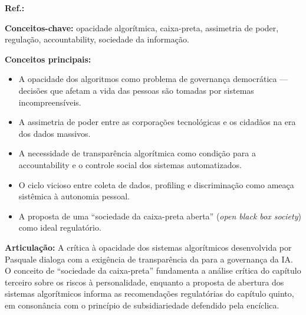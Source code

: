 \begin{fichamento}
    \textbf{Ref.:} \cite{Pasquale2015BM}
    
    \textbf{Conceitos-chave:} opacidade algorítmica, caixa-preta, assimetria de poder, regulação, accountability, sociedade da informação.
    
    \textbf{Conceitos principais:}
    \begin{itemize}
        \item A opacidade dos algoritmos como problema de governança democrática — decisões que afetam a vida das pessoas são tomadas por sistemas incompreensíveis.
        \item A assimetria de poder entre as corporações tecnológicas e os cidadãos na era dos dados massivos.
        \item A necessidade de transparência algorítmica como condição para a accountability e o controle social dos sistemas automatizados.
        \item O ciclo vicioso entre coleta de dados, profiling e discriminação como ameaça sistêmica à autonomia pessoal.
        \item A proposta de uma ``sociedade da caixa-preta aberta'' (\textit{open black box society}) como ideal regulatório.
    \end{itemize}
    
    \textbf{Articulação:} A crítica à opacidade dos sistemas algorítmicos desenvolvida por Pasquale dialoga com a exigência de transparência da \MH{} para a governança da IA. O conceito de ``sociedade da caixa-preta'' fundamenta a análise crítica do capítulo terceiro sobre os riscos à personalidade, enquanto a proposta de abertura dos sistemas algorítmicos informa as recomendações regulatórias do capítulo quinto, em consonância com o princípio de subsidiariedade defendido pela encíclica.
\end{fichamento}

